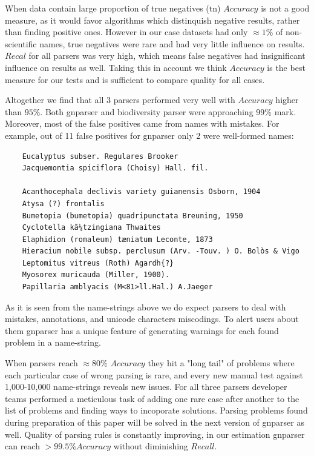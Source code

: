 \documentclass{bmcart}
\begin{document}
When data contain large proportion of true negatives ($\text{tn}$) $Accuracy$
is not a good measure, as it would favor algorithms which distinquish negative
results, rather than finding positive ones. However in our case datasets had
only $\approx1\%$ of non-scientific names, true negatives were rare and had
very little influence on results. $Recal$ for all parsers was very high, which
means false negatives had insignificant influence on results as well. Taking
this in account we think $Accuracy$ is the best measure for our tests and
is sufficient to compare quality for all cases.

Altogether we find that all 3 parsers performed very well with $Accuracy$
higher than $95\%$. Both gnparser and biodiversity parser were approaching
99\% mark. Moreover, most of the false positives came from names with
mistakes. For example, out of 11 false positives for gnparser only 2 were
well-formed names:

\vspace{0.5cm}
\begin{verbatim}
    Eucalyptus subser. Regulares Brooker
    Jacquemontia spiciflora (Choisy) Hall. fil.

    Acanthocephala declivis variety guianensis Osborn, 1904
    Atysa (?) frontalis
    Bumetopia (bumetopia) quadripunctata Breuning, 1950
    Cyclotella kã¼tzingiana Thwaites
    Elaphidion (romaleum) tæniatum Leconte, 1873
    Hieracium nobile subsp. perclusum (Arv. -Touv. ) O. Bolòs & Vigo
    Leptomitus vitreus (Roth) Agardh{?}
    Myosorex muricauda (Miller, 1900).
    Papillaria amblyacis (M<81>ll.Hal.) A.Jaeger
\end{verbatim}
\vspace{0.5cm}

As it is seen from the name-strings above we do expect parsers to deal with
mistakes, annotations, and unicode characters miscodings. To alert users
about them gnparser has a unique feature of generating warnings for each found
problem in a name-string.

When parsers reach $\approx80\%$ $Accuracy$ they hit a "long tail" of problems
where each particular case of wrong parsing is rare, and every new manual test
against 1,000-10,000 name-strings reveals new issues. For all three parsers
developer teams performed a meticulous task of adding one rare case after
another to the list of problems and finding ways to incoporate solutions.
Parsing problems found during preparation of this paper will be solved in the
next version of gnparser as well. Quality of parsing rules is constantly
improving, in our estimation gnparser can reach $> 99.5\% Accuracy$
without diminishing $Recall$.
\end{document}
